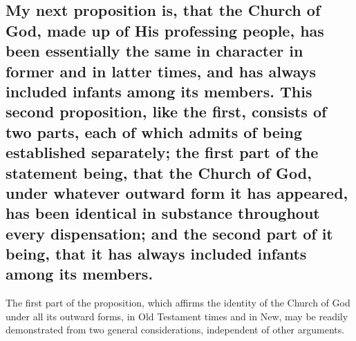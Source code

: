 \documentclass[english,]{book}
\begin{document}
\hypertarget{my-next-proposition-is-that-the-church-of-god-made-up-of-his-professing-people-has-been-essentially-the-same-in-character-in-former-and-in-latter-times-and-has-always-included-infants-among-its-members.-this-second-proposition-like-the-first-consists-of-two-parts-each-of-which-admits-of-being-established-separately-the-first-part-of-the-statement-being-that-the-church-of-god-under-whatever-outward-form-it-has-appeared-has-been-identical-in-substance-throughout-every-dispensation-and-the-second-part-of-it-being-that-it-has-always-included-infants-among-its-members.}{%
\subsection{My next proposition is, that the Church of God, made up of His professing people, has been essentially the same in character in former and in latter times, and has always included infants among its members. This second proposition, like the first, consists of two parts, each of which admits of being established separately; the first part of the statement being, that the Church of God, under whatever outward form it has appeared, has been identical in substance throughout every dispensation; and the second part of it being, that it has always included infants among its members.}\label{my-next-proposition-is-that-the-church-of-god-made-up-of-his-professing-people-has-been-essentially-the-same-in-character-in-former-and-in-latter-times-and-has-always-included-infants-among-its-members.-this-second-proposition-like-the-first-consists-of-two-parts-each-of-which-admits-of-being-established-separately-the-first-part-of-the-statement-being-that-the-church-of-god-under-whatever-outward-form-it-has-appeared-has-been-identical-in-substance-throughout-every-dispensation-and-the-second-part-of-it-being-that-it-has-always-included-infants-among-its-members.}}

The first part of the proposition, which affirms the identity of the Church of God under all its outward forms, in Old Testament times and in New, may be readily demonstrated from two general considerations, independent of other arguments.
\end{document}
